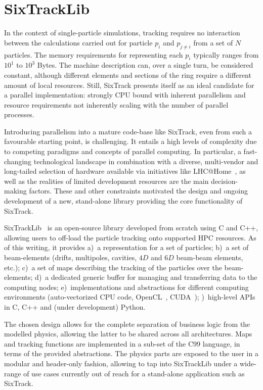 \documentclass[a4paper,
              ]{jacow}
\begin{document}
\section{SixTrackLib}

In the context of single-particle simulations, tracking requires no interaction between the calculations carried out for particle $p_i$ and $p_{j\neq i}$ from a set of $N$ particles. The memory requirements for representing each $p_i$ typically ranges from $10^1$ to $10^3$ Bytes. The machine description can, over a single turn, be considered constant, although different elements and sections of the ring require a different amount of local resources. Still, SixTrack presents itself as an ideal candidate for a parallel implementation: strongly CPU bound with inherent parallelism and resource requirements not inherently scaling with the number of parallel processes. 

Introducing parallelism into a mature code-base like SixTrack, even from such a favourable starting point, is challenging. It entails a high levels of complexity due to competing paradigms and concepts of parallel computing. In particular, a fast-changing technological landscape in combination with a diverse, multi-vendor and long-tailed selection of hardware available via initiatives like LHC@Home~\cite{lhcathome}, as well as the realities of limited development resources are the main decision-making factors. These and other constraints motivated the design and ongoing development of a new, stand-alone library providing the core functionality of SixTrack.

SixTrackLib~\cite{sixtracklib} is an open-source library developed from scratch using C and C++, allowing users to off-load the particle tracking onto supported HPC resources. As of this writing, it provides
a)~a representation for a set of particles; b)~a set of beam-elements (drifts, multipoles, cavities, $4D$ and $6D$ beam-beam elements, etc.); c)~a set of maps describing the tracking of the particles over the beam-elements; d)~a dedicated generic buffer for managing and transferring data to the computing nodes; e)~implementations and abstractions for different computing environments (auto-vectorized CPU code, OpenCL~\cite{opencl}, CUDA~\cite{cuda}); )~high-level APIs in C, C++ and (under development) Python.

The chosen design allows for the complete separation of business logic from the modelled physics, allowing the latter to be shared across all architectures. Maps and tracking functions are implemented in a sub-set of the C99 language, in terms of the provided abstractions. The physics parts are exposed to the user in a modular and header-only fashion, allowing to tap into SixTrackLib under a wide-range of use cases currently out of reach for a stand-alone application such as SixTrack.
\end{document}
